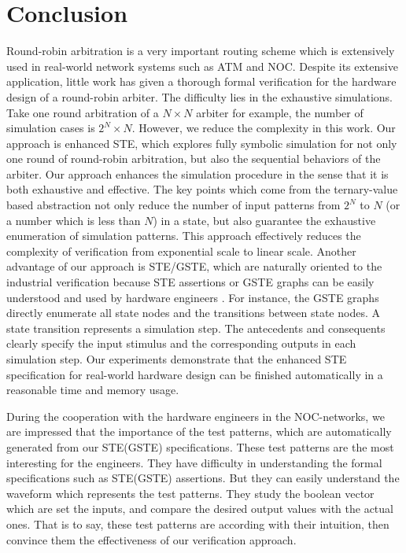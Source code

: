 \documentclass[final]{IEEEtran}
\begin{document}
\section{Conclusion}\label{sec:conclusion}

Round-robin arbitration is a very important routing scheme which
is extensively used in real-world network systems such as ATM and
NOC. Despite its extensive application, little work has given a
thorough formal verification for the hardware design of a
round-robin arbiter. The difficulty lies in the   exhaustive
simulations. Take one round arbitration of a $ N\times N$ arbiter
for example, the number of simulation cases is $2^N\times N$.
However, we reduce the complexity in this work. Our
approach is enhanced STE, which explores fully symbolic simulation
for not only one round of round-robin arbitration, but also the
sequential behaviors of the arbiter. Our approach enhances the
simulation procedure in the sense that it is both
exhaustive and effective. The key points which come from the ternary-value
based abstraction not only reduce the number of input
patterns from $2^N$ to $N$ (or a number which is less than $N$) in a
state, but also guarantee the exhaustive enumeration of simulation
patterns. This approach effectively reduces the complexity of
verification from exponential scale to linear scale. Another
advantage of our approach is STE/GSTE, which are   naturally
oriented to the industrial verification because STE assertions or
GSTE graphs can be easily understood and used by hardware engineers
\cite{DBLP:conf/atva/Yang06}. For instance, the GSTE graphs directly
enumerate all state nodes and the transitions between state nodes. A
state transition represents a simulation step. The antecedents and
consequents clearly specify the input stimulus and the corresponding
outputs in each simulation step.  Our experiments demonstrate that
the enhanced STE specification for real-world hardware design can be
finished automatically in a reasonable time and memory usage.

During the cooperation with the hardware engineers in the
NOC-networks, we are impressed that the importance of the test
patterns, which are automatically generated from our STE(GSTE)
specifications.  These test patterns are the most interesting for
the engineers. They have difficulty in understanding the formal
specifications such as STE(GSTE) assertions. But they can easily
understand the waveform which represents the test patterns. They
study the boolean vector which are set the inputs, and compare the
desired output values with the actual ones. That is to say, these
test patterns are according with their intuition, then convince them
  the effectiveness of our verification approach.




\end{document}
